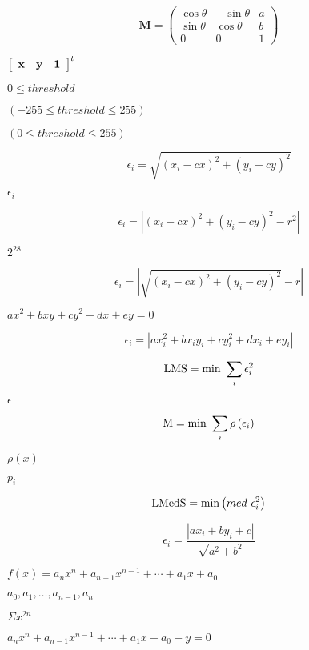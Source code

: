 \documentclass{article}
\begin{document}
{{{\[ \mathbf{M} = \left( \begin{array}{ccc} \cos \theta & - \sin \theta & a \\ \sin \theta & \cos \theta & b \\ 0 & 0 & 1 \end{array} \right) \]
\pagebreak

$ \left[ \begin{array}{ccc} \bf{x} & \bf{y} & \bf{1} \end{array} \right]^t $
\pagebreak

$ 0 \leq threshold $
\pagebreak

$ (-255 \leq threshold \leq 255 ) $
\pagebreak

$ (0 \leq threshold \leq 255) $
\pagebreak

\[ \epsilon _{i} = \sqrt{ ( x _{i} - cx ) ^{2} + ( y _{i} - cy ) ^{2} } \]
\pagebreak

$ \epsilon _{i} $
\pagebreak

\[ \epsilon _{i} = | ( x _{i} - cx ) ^{2} + ( y _{i} - cy ) ^{2} - r ^{2} | \]
\pagebreak

$ 2^{28} $
\pagebreak

\[ \epsilon _{i} = | \sqrt{ ( x _{i} - cx ) ^{2} + ( y _{i} - cy ) ^{2} } - r | \]
\pagebreak

$ ax ^{2} + bxy + cy ^{2} + dx + ey = 0 $
\pagebreak

\[ \epsilon _{i} = | ax _{i} ^{2} + bx _{i} y _{i} + cy _{i} ^{2} + dx _{i} + ey _{i} | \]
\pagebreak

\[ {\rm LMS} = \min\ \sum _{i} \epsilon _{i} ^{2} \]
\pagebreak

$ \epsilon $
\pagebreak

\[ {\rm M} = \min\ \sum _{i} \rho \left( \epsilon _{i} \right) \]
\pagebreak

$ \rho \left( x \right) $
\pagebreak

$ p_{i} $
\pagebreak

\[ {\rm LMedS} = \min\left( med\ \epsilon _{i} ^2 \right) \]
\pagebreak

\[ \epsilon _{i} = \frac{ | ax _{i} + by _{i} + c | }{ \sqrt{ a ^{2} + b ^{2} } } \]
\pagebreak

$ f(x)=a_{n}x^{n} + a_{n-1}x^{n-1} + \cdots + a_{1}x + a_{0} $
\pagebreak

$ a_{0}, a_{1},\ldots, a_{n-1}, a_{n}$
\pagebreak

$ \Sigma x^{2n} $
\pagebreak

$ a_{n}x^{n} + a_{n-1}x^{n-1} + \cdots + a_{1}x + a_{0} - y = 0 $
\pagebreak

}}}
\end{document}
